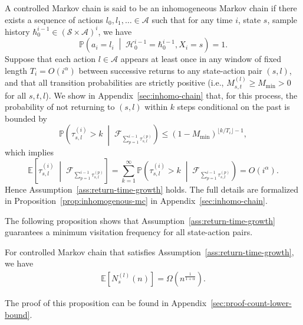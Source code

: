 \documentclass[twoside,11pt]{article}
\newcommand{\pow}[1]{^{(#1)}}%
\numberwithin{equation}{section}
\newcommand{\lp}{\left(}
\newcommand{\rp}{\right)}
\newcommand{\lb}{\left[}
\newcommand{\rb}{\right]}
\newcommand{\History}{\mathcal{H}}
\newcommand{\history}{\hbar}
\newcommand{\Pbb}{\mathbb{P}}
\newcommand{\prob}{\Pbb}
\begin{document}
\begin{example}
\label{exp:return-time-growth}
A controlled Markov chain is said to be an inhomogeneous Markov chain if there exists a sequence of actions $l_0,l_1,\ldots \in \mathcal A$ such that for any time $i$, state $s$, sample history $\history_0^{i-1} \in (\mathcal{S}\times\mathcal{A})^i$, we have
\[
\prob\lp a_i=l_i\;\middle|\;\History_0^{i-1}=\history_0^{i-1},X_i=s \rp=1.
\]
Suppose that each action $l \in \mathcal A$ appears at least once in any window of fixed length
$T_i = O(i^\alpha)$ between successive returns to any state-action pair $(s,l)$, and that all
transition probabilities are strictly positive (i.e.,
$M^{(l)}_{s,t} \ge M_{\min} > 0$ for all $s,t,l$). 
We show in Appendix~\ref{sec:inhomo-chain} that, for this process, the probability of not returning to $(s,l)$ within $k$ steps conditional on the
past is bounded by
\[
\mathbb P \lp\tau \pow i_{s,l} > k \;\middle|\;
\mathcal{F}_{\sum_{p=1}^{i-1}\tau^{(p)}_{s,l}}\rp
\leq (1-M_{\min})^{\lfloor k/T_i \rfloor -1},
\]
which implies
\[
\mathbb{E} \left[\tau^{(i)}_{s,l} \;\middle|\;
\mathcal{F}_{\sum_{p=1}^{i-1}\tau^{(p)}_{s,l}}\right] = \sum_{k=1}^\infty \mathbb P \lp\tau \pow i_{s,l} > k \;\middle|\;
\mathcal{F}_{\sum_{p=1}^{i-1}\tau^{(p)}_{s,l}}\rp = O(i^\alpha).
\]
Hence Assumption~\ref{ass:return-time-growth} holds.
The full details are formalized in Proposition~\ref{prop:inhomogenous-mc} in Appendix~\ref{sec:inhomo-chain}.
\end{example}

The following proposition shows that Assumption~\ref{ass:return-time-growth} guarantees a minimum visitation frequency for all state-action pairs.
\begin{proposition}
    \label{prop:count-lower-bound}
    For controlled Markov chain that satisfies Assumption~\ref{ass:return-time-growth}, we have
    \begin{align*}
        \mathbb{E}\lb N_s \pow l (n) \rb = \Omega\lp n^{\frac{1}{1+\alpha}}\rp.
    \end{align*}
\end{proposition}
The proof of this proposition can be found in Appendix~\ref{sec:proof-count-lower-bound}.
\end{document}
